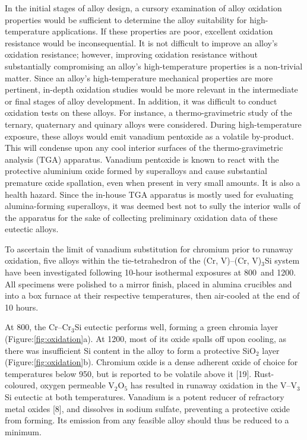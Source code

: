 In the initial stages of alloy design, a cursory examination of alloy oxidation properties would be sufficient to determine the alloy suitability for high-temperature applications.  If these properties are poor, excellent oxidation resistance would be inconsequential.  It is not difficult to improve an alloy’s oxidation resistance; however, improving oxidation resistance without substantially compromising an alloy’s high-temperature properties is a non-trivial matter.  Since an alloy's high-temperature mechanical properties are more pertinent, in-depth oxidation studies would be more relevant in the intermediate or final stages of alloy development.  In addition, it was difficult to conduct oxidation tests on these alloys.  For instance, a thermo-gravimetric study of the ternary, quaternary and quinary alloys were considered.  During high-temperature exposure, these alloys would emit vanadium pentoxide as a volatile by-product.  This will condense upon any cool interior surfaces of the thermo-gravimetric analysis (TGA) apparatus. Vanadium pentoxide is known to react with the protective aluminium oxide formed by superalloys and cause substantial premature oxide spallation, even when present in very small amounts.  It is also a health hazard.  Since the in-house TGA apparatus is mostly used for evaluating alumina-forming superalloys, it was deemed best not to sully the interior walls of the apparatus for the sake of collecting preliminary oxidation data of these eutectic alloys. 

To ascertain the limit of vanadium substitution for chromium prior to runaway oxidation, five alloys within the tie-tetrahedron of the (Cr, V)--(Cr, V)$_3$Si system have been investigated following 10-hour isothermal exposures at 800\celsius\ and 1200\celsius.   All specimens were polished to a mirror finish, placed in alumina crucibles and into a box furnace at their respective temperatures, then air-cooled at the end of 10 hours.

At 800\celsius, the Cr--Cr$_3$Si eutectic performs well, forming a green chromia layer (Figure:\ref{fig:oxidation}a).  At 1200\celsius, most of its oxide spalls off upon cooling, as there was insufficient Si content in the alloy to form a protective SiO$_2$ layer (Figure:\ref{fig:oxidation}b).  Chromium oxide is a dense adherent oxide of choice for temperatures below 950\celsius, but is reported to be volatile above it [19]. 
Rust-coloured, oxygen permeable V$_2$O$_5$ has resulted in runaway oxidation in the V--V$_3$Si eutectic at both temperatures.  Vanadium is a potent reducer of refractory metal oxides [8], and dissolves in sodium sulfate, preventing a protective oxide from forming.  Its emission from any feasible alloy should thus be reduced to a minimum.

